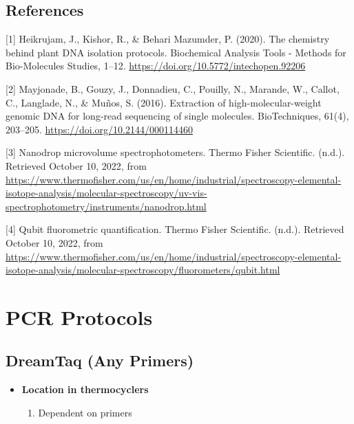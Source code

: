 \documentclass[
]{book}
\providecommand{\tightlist}{%
  \setlength{\itemsep}{0pt}\setlength{\parskip}{0pt}}
\begin{document}
\hypertarget{references}{%
\section{References~}\label{references}}

{[}1{]} Heikrujam, J., Kishor, R., \& Behari Mazumder, P. (2020). The chemistry behind plant DNA isolation protocols. Biochemical Analysis Tools - Methods for Bio-Molecules Studies, 1--12. \url{https://doi.org/10.5772/intechopen.92206}~

{[}2{]} Mayjonade, B., Gouzy, J., Donnadieu, C., Pouilly, N., Marande, W., Callot, C., Langlade, N., \& Muños, S. (2016). Extraction of high-molecular-weight genomic DNA for long-read sequencing of single molecules. BioTechniques, 61(4), 203--205. \url{https://doi.org/10.2144/000114460}~

{[}3{]} Nanodrop microvolume spectrophotometers. Thermo Fisher Scientific. (n.d.). Retrieved October 10, 2022, from \url{https://www.thermofisher.com/us/en/home/industrial/spectroscopy-elemental-isotope-analysis/molecular-spectroscopy/uv-vis-spectrophotometry/instruments/nanodrop.html}~

{[}4{]} Qubit fluorometric quantification. Thermo Fisher Scientific. (n.d.). Retrieved October 10, 2022, from \url{https://www.thermofisher.com/us/en/home/industrial/spectroscopy-elemental-isotope-analysis/molecular-spectroscopy/fluorometers/qubit.html}

\hypertarget{pcr-protocols}{%
\chapter{PCR Protocols}\label{pcr-protocols}}

\hypertarget{dreamtaq-any-primers}{%
\section{DreamTaq (Any Primers)}\label{dreamtaq-any-primers}}

\begin{itemize}
\tightlist
\item
  \textbf{Location in thermocyclers}

  \begin{enumerate}
  \def\labelenumi{\arabic{enumi}.}
  \tightlist
  \item
    Dependent on primers
  \end{enumerate}
\end{itemize}
\end{document}
